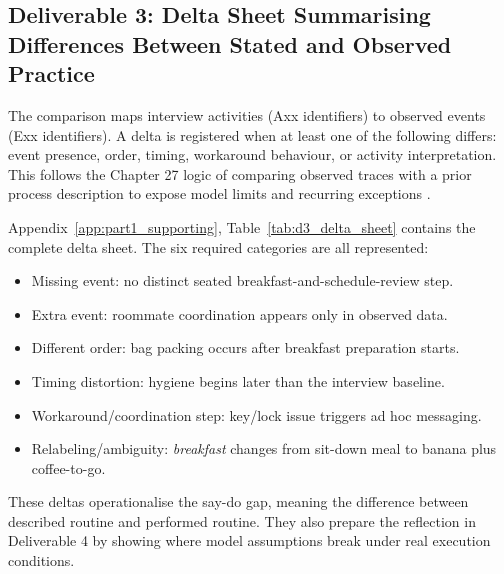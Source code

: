 \subsection{Deliverable 3: Delta Sheet Summarising Differences Between Stated and Observed Practice}
\label{sec:deliverable3}

The comparison maps interview activities (Axx identifiers) to observed events (Exx identifiers). A delta is registered when at least one of the following differs: event presence, order, timing, workaround behaviour, or activity interpretation. This follows the Chapter 27 logic of comparing observed traces with a prior process description to expose model limits and recurring exceptions .

Appendix~\ref{app:part1_supporting}, Table~\ref{tab:d3_delta_sheet} contains the complete delta sheet. The six required categories are all represented:
\begin{itemize}
  \item Missing event: no distinct seated breakfast-and-schedule-review step.
  \item Extra event: roommate coordination appears only in observed data.
  \item Different order: bag packing occurs after breakfast preparation starts.
  \item Timing distortion: hygiene begins later than the interview baseline.
  \item Workaround/coordination step: key/lock issue triggers ad hoc messaging.
  \item Relabeling/ambiguity: \textit{breakfast} changes from sit-down meal to banana plus coffee-to-go.
\end{itemize}

These deltas operationalise the say-do gap, meaning the difference between described routine and performed routine. They also prepare the reflection in Deliverable 4 by showing where model assumptions break under real execution conditions.
